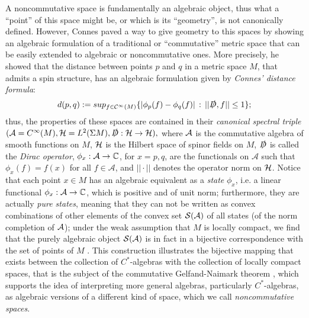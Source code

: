 A noncommutative space is fundamentally an algebraic object, thus what a ``point'' of this space might be, or which is its ``geometry'', is not canonically defined. However, Connes \cite{Connes1994} paved a way to give geometry to this spaces by showing an algebraic formulation of a traditional or ``commutative'' metric space that can be easily extended to algebraic or noncommutative ones. More precisely, he showed that the distance between points $p$ and $q$ in a metric space $M$, that admits a spin structure, has an algebraic formulation given by \textit{Connes' distance formula}: 
\begin{equation}\label{ConnesDistanceCommutative}
    d(p, q) := sup_{f \in \mathcal C^\infty(M)}\{ |\phi_p(f) - \phi_q(f)| \,:\,  ||\slashed D, f|| \leq 1 \};
\end{equation}
thus, the properties of these spaces are contained in their \emph{canonical spectral triple} $(\mathcal A = C^\infty(M), \mathcal H = L^2(\Sigma M), \slashed D: \mathcal H \to \mathcal H),$ where $\mathcal A$ is the commutative algebra of smooth functions on $M$, $\mathcal H$ is the Hilbert space of spinor fields on $M$, $\slashed D$ is called the \emph{Dirac operator}, $\phi_x: \acal \to \CC$, for $x = p, q$, are the functionals on $\mathcal A$ such that $\phi_x(f) = f(x)$ for all $f \in \mathcal A$, and $|| \cdot ||$ denotes the operator norm on $\mathcal H$. Notice that each point $x \in M$ has an algebraic equivalent as a \emph{state} $\phi_x$, i.e. a linear functional $\phi_x: \acal \to \CC$, which is positive and of unit norm; furthermore, they are actually \emph{pure states}, meaning that they can not be written as convex combinations of other elements of the convex set $\mathcal S(\mathcal A)$ of all states (of the norm completion of $\mathcal A$); under the weak assumption that $M$ is locally compact, we find that the purely algebraic object $\mathcal S(\mathcal A)$ is in fact in a bijective correspondence with the set of points of $M$ \cite{Varilly2006}. This construction illustrates the bijective mapping that exists between the collection of $C^*$-algebras with the collection of locally compact spaces, that is the subject of the commutative Gelfand-Naimark theorem \cite{Bratteli1987}, which supports the idea of interpreting more general algebras, particularly $C^*$-algebras, as algebraic versions of a different kind of space, which we call \emph{noncommutative spaces}.

